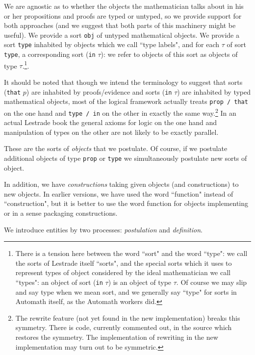 \documentclass[12pt]{article}
\begin{document}
We are agnostic as to whether the objects the mathematician talks about in his or her propositions and proofs are typed or untyped, so we provide support for both approaches
(and we suggest that both parts of this machinery might be useful).  We provide a sort {\tt obj} of untyped mathematical objects.  We provide a sort {\tt type} inhabited
by objects which we call ``type labels", and for each $\tau$ of sort {\tt type}, a corresponding sort ({\tt in} $\tau$):  we refer to objects of this sort as objects of type $\tau$.\footnote{There is a tension here between the word ``sort" and the word ``type":  we call the sorts of Lestrade itself ``sorts", and the special sorts which it uses to represent types of object considered by the ideal mathematician we call ``types":  an object of sort ({\tt in} $\tau$) is an object of type $\tau$.  Of course we may slip and say type when we mean sort, and we generally say ``type" for sorts in Automath itself, as the Automath workers did.}.

It should be noted that though we intend
the terminology to suggest that sorts ({\tt that} $p$) are inhabited by proofs/evidence and sorts ({\tt in} $\tau$) are inhabited by typed mathematical objects, most of the logical framework actually treats  {\tt prop / that} on the one hand and {\tt type / in} on the other in exactly the same way.\footnote{The rewrite feature (not yet found in the new implementation) breaks this symmetry.  There is code, currently commented out, in the source which restores the symmetry.  The implementation of rewriting in the new implementation may turn out to be symmetric.}   In an actual Lestrade book the general axioms for logic on the one hand and manipulation of types on the other are not likely to be exactly parallel.

These are the sorts of {\em objects} that we postulate.  Of course, if we postulate additional objects of type {\tt prop} or {\tt type} we simultaneously postulate new sorts of object.

In addition, we have {\em constructions\/} taking given objects (and constructions) to new objects.  In earlier versions, we have used the word ``function" instead of ``construction", but it is better to use the word function for  objects implementing or in a sense packaging constructions.

We introduce entities by two processes:  {\em postulation} and {\em definition}.
\end{document}

